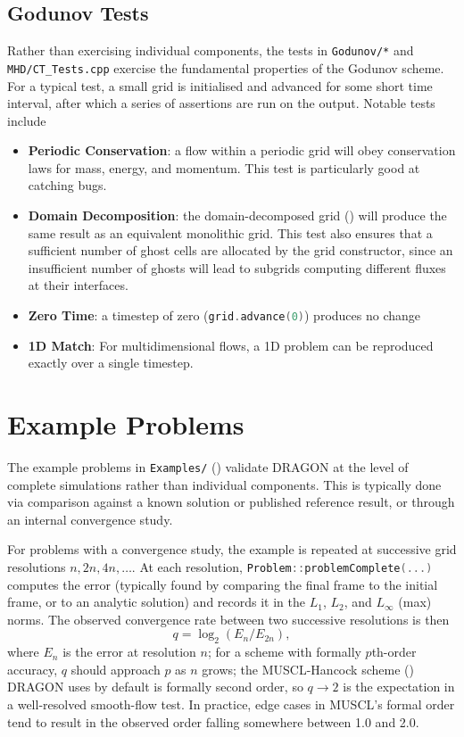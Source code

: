 \documentclass[11pt]{report}
\newcommand{\cpp}[1]{\lstinline[language=C++]{#1}}
\newcommand{\bash}[1]{\lstinline[language=bash]{#1}}
\begin{document}
\subsection{Godunov Tests}

Rather than exercising individual components, the tests in \bash{Godunov/*} and \bash{MHD/CT_Tests.cpp} exercise the fundamental properties of the Godunov scheme. For a typical test, a small grid is initialised and advanced for some short time interval, after which a series of assertions are run on the output.  
Notable tests include
\begin{itemize}
 \item \textbf{Periodic Conservation}: a flow within a periodic grid will obey conservation laws for mass, energy, and momentum. This test is particularly good at catching bugs.
 \item \textbf{Domain Decomposition}: the domain-decomposed grid () will produce the same result as an equivalent monolithic grid. This test also ensures that a sufficient number of ghost cells are allocated by the grid constructor, since an insufficient number of ghosts will lead to subgrids computing different fluxes at their interfaces.
\item \textbf{Zero Time}: a timestep of zero (\cpp{grid.advance(0)}) produces no change
 \item \textbf{1D Match}: For multidimensional flows, a 1D problem can be reproduced exactly over a single timestep.
\end{itemize}


\section{Example Problems}
\label{sec:tests-examples}

The example problems in \bash{Examples/} () validate DRAGON at the level of complete simulations rather than individual components. This is typically done via comparison against a known solution or published reference result, or through an internal convergence study.


For problems with a convergence study, the example is repeated at successive grid resolutions $n, 2n, 4n, \dots$. At each resolution, \cpp{Problem::problemComplete(...)} computes the error (typically found by comparing the final frame to the initial frame, or to an analytic solution) and records it in  the $L_1$, $L_2$, and $L_\infty$ (max) norms. The observed convergence rate between two successive resolutions is then
\begin{equation} q = \log_2(E_n/E_{2n}), \end{equation}
where $E_n$ is the error at resolution $n$; for a scheme with formally $p$th-order accuracy, $q$ should approach $p$ as $n$ grows; the MUSCL-Hancock scheme () DRAGON uses by default is formally second order, so $q\to2$ is the expectation in a well-resolved smooth-flow test. In practice, edge cases in MUSCL's formal order tend to result in the observed order falling somewhere between 1.0 and 2.0.
\end{document}
